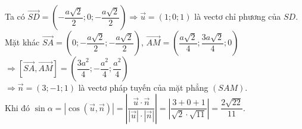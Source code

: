 \begin{ex}
{{
		}
		\noindent Ta có $\vec{SD}=\left(-\dfrac{a\sqrt{2}}{2};0;-\dfrac{a\sqrt{2}}{2}\right)\Rightarrow \vec{u}=\left(1;0;1\right)$ là vectơ chỉ phương của $SD.$\\
		Mặt khác $\vec{SA}=\left(0;-\dfrac{a\sqrt{2}}{2};-\dfrac{a\sqrt{2}}{2}\right)$, $\vec{AM}=\left(\dfrac{a\sqrt{2}}{4};\dfrac{3a\sqrt{2}}{4};0\right)$
		$\Rightarrow \left[\vec{SA},\vec{AM}\right]=\left(\dfrac{3a^2}{4};-\dfrac{a^2}{4};\dfrac{a^2}{4}\right)$\\
		$\Rightarrow \vec{n}=(3;-1;1)$ là vectơ pháp tuyến của mặt phẳng $(SAM).$\\
		Khi đó $\sin\alpha=\left|\cos(\vec{u},\vec{n})\right|=\left|\dfrac{\vec{u}\cdot \vec{n}}{|\vec{u}|\cdot |\vec{n}|}\right|=\left|\dfrac{3+0+1}{\sqrt{2}\cdot \sqrt{11}}\right|=\dfrac{2\sqrt{22}}{11}.$
	}
\end{ex}
